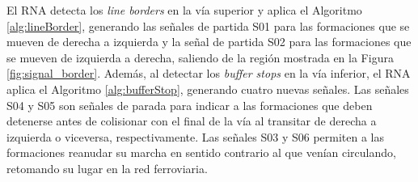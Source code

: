     El RNA detecta los \textit{line borders} en la vía superior y aplica el Algoritmo \ref{alg:lineBorder}, generando las señales de partida S01 para las formaciones que se mueven de derecha a izquierda y la señal de partida S02 para las formaciones que se mueven de izquierda a derecha, saliendo de la región mostrada en la Figura \ref{fig:signal_border}. Además, al detectar los \textit{buffer stops} en la vía inferior, el RNA aplica el Algoritmo \ref{alg:bufferStop}, generando cuatro nuevas señales. Las señales S04 y S05 son señales de parada para indicar a las formaciones que deben detenerse antes de colisionar con el final de la vía al transitar de derecha a izquierda o viceversa, respectivamente. Las señales S03 y S06 permiten a las formaciones reanudar su marcha en sentido contrario al que venían circulando, retomando su lugar en la red ferroviaria.